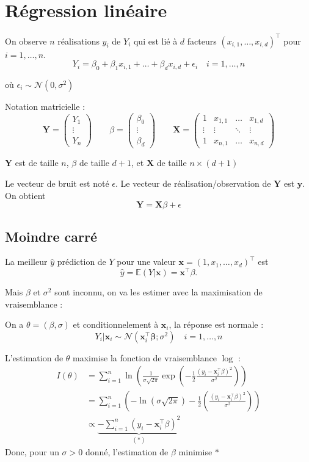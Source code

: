 \documentclass[12pt,a4paper]{article}
\begin{document}
\section{Régression linéaire}

On observe $n$ réalisations $y_i$ de $Y_i$ qui est lié à $d$ facteurs $(x_{i,1},\dots,x_{i,d})^\intercal$ pour $i = 1,\dots,n$. 
$$Y_i = \beta_0 + \beta_1 x_{i,1} + \dots + \beta_d x_{i,d} + \epsilon_i \quad i = 1, \dots, n$$

où $\epsilon_i \sim \mathcal{N}(0,\sigma^2)$

Notation matricielle :
$$
\mathbf{Y} = \begin{pmatrix} Y_1 \\ \vdots \\ Y_n \end{pmatrix} \qquad
\beta = \begin{pmatrix} \beta_0 \\ \vdots \\ \beta_d \end{pmatrix} \qquad
\mathbf{X} = \begin{pmatrix} 1 & x_{1,1} & \dots & x_{1,d} \\ \vdots & \vdots & \ddots & \vdots \\ 1 & x_{n,1} & \dots & x_{n,d} \end{pmatrix}
$$

$\mathbf{Y}$ est de taille $n$, $\beta$ de taille $d+1$, et $\mathbf{X}$ de taille $n\times (d+1)$

Le vecteur de bruit est noté $\epsilon$. Le vecteur de réalisation/observation de $\mathbf{Y}$ est $\mathbf{y}$. On obtient
$$\mathbf{Y} = \mathbf{X}\beta + \epsilon$$

\subsection{Moindre carré}

La meilleur $\hat{y}$ prédiction de $Y$ pour une valeur $\mathbf{x}=(1,x_1,\dots,x_d)^\intercal$ est
$$\hat{y} = \mathbb{E}(Y | \mathbf{x}) = \mathbf{x}^\top \beta.$$

Mais $\beta$ et $\sigma^2$ sont inconnu, on va les estimer avec la maximisation de vraisemblance :

On a $\theta = (\beta,\sigma)$ et conditionnelement à $\mathbf{x}_i$, la réponse est normale :
$$ Y_i | \mathbf{x}_i \sim \mathcal{N}(\mathbf{x}_i^\top \boldsymbol{\beta}; \sigma^2) \quad i = 1, \dots, n $$

L'estimation de $\theta$ maximise la fonction de vraisemblance $\log$ :
\begin{align*}
I(\theta) &= \sum_{i=1}^{n} \ln \left( \frac{1}{\sigma\sqrt{2\pi}} \exp \left( -\frac{1}{2} \frac{(y_i - \mathbf{x}_i^\top \beta)^2}{\sigma^2} \right) \right) \\
&= \sum_{i=1}^{n} \left( -\ln(\sigma\sqrt{2\pi}) - \frac{1}{2} \left( \frac{(y_i - \mathbf{x}_i^\top \beta)^2}{\sigma^2} \right) \right) \\
&\propto \underbrace{- \sum_{i=1}^{n} (y_i - \mathbf{x}_i^\top \beta)^2}_{(*)}
\end{align*}
Donc, pour un $\sigma > 0$ donné, l'estimation de $\beta$ minimise $*$
\end{document}
